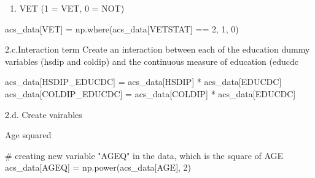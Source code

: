 \documentclass[
  11pt,
  letterpaper,
  DIV=11,
  numbers=noendperiod]{scrartcl}
\newenvironment{Shaded}{\begin{snugshade}}{\end{snugshade}}
\newcommand{\CommentTok}[1]{\textcolor[rgb]{0.37,0.37,0.37}{#1}}
\newcommand{\DecValTok}[1]{\textcolor[rgb]{0.68,0.00,0.00}{#1}}
\newcommand{\NormalTok}[1]{\textcolor[rgb]{0.00,0.23,0.31}{#1}}
\newcommand{\OperatorTok}[1]{\textcolor[rgb]{0.37,0.37,0.37}{#1}}
\newcommand{\StringTok}[1]{\textcolor[rgb]{0.13,0.47,0.30}{#1}}
\providecommand{\tightlist}{%
  \setlength{\itemsep}{0pt}\setlength{\parskip}{0pt}}\usepackage{longtable,booktabs,array}
\begin{document}
\begin{enumerate}
\def\labelenumi{\roman{enumi}.}
\setcounter{enumi}{7}
\tightlist
\item
  VET (1 = VET, 0 = NOT)
\end{enumerate}

\begin{Shaded}
\begin{Highlighting}[]
\NormalTok{acs\_data[}\StringTok{\textquotesingle{}VET\textquotesingle{}}\NormalTok{] }\OperatorTok{=}\NormalTok{ np.where(acs\_data[}\StringTok{\textquotesingle{}VETSTAT\textquotesingle{}}\NormalTok{] }\OperatorTok{==} \DecValTok{2}\NormalTok{, }\DecValTok{1}\NormalTok{, }\DecValTok{0}\NormalTok{)}
\end{Highlighting}
\end{Shaded}

2.c.Interaction term Create an interaction between each of the education
dummy variables (hsdip and coldip) and the continuous measure of
education (educdc

\begin{Shaded}
\begin{Highlighting}[]
\NormalTok{acs\_data[}\StringTok{\textquotesingle{}HSDIP\_EDUCDC\textquotesingle{}}\NormalTok{] }\OperatorTok{=}\NormalTok{ acs\_data[}\StringTok{\textquotesingle{}HSDIP\textquotesingle{}}\NormalTok{] }\OperatorTok{*}\NormalTok{ acs\_data[}\StringTok{\textquotesingle{}EDUCDC\textquotesingle{}}\NormalTok{]}
\NormalTok{acs\_data[}\StringTok{\textquotesingle{}COLDIP\_EDUCDC\textquotesingle{}}\NormalTok{] }\OperatorTok{=}\NormalTok{ acs\_data[}\StringTok{\textquotesingle{}COLDIP\textquotesingle{}}\NormalTok{] }\OperatorTok{*}\NormalTok{ acs\_data[}\StringTok{\textquotesingle{}EDUCDC\textquotesingle{}}\NormalTok{]}
\end{Highlighting}
\end{Shaded}

2.d. Create vairables

Age squared

\begin{Shaded}
\begin{Highlighting}[]
\CommentTok{\# creating new variable "AGEQ" in the data, which is the square of AGE}
\NormalTok{acs\_data[}\StringTok{\textquotesingle{}AGEQ\textquotesingle{}}\NormalTok{] }\OperatorTok{=}\NormalTok{ np.power(acs\_data[}\StringTok{\textquotesingle{}AGE\textquotesingle{}}\NormalTok{], }\DecValTok{2}\NormalTok{)}
\end{Highlighting}
\end{Shaded}
\end{document}
